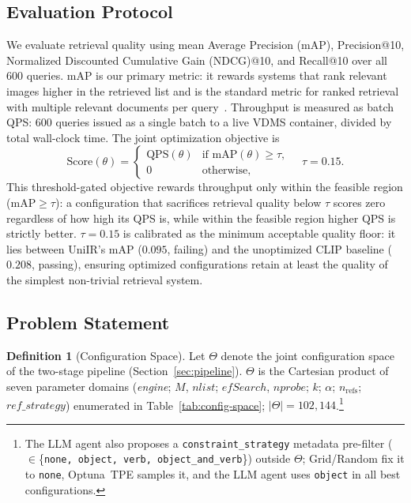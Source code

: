 \documentclass[sigconf, nonacm]{acmart}
\theoremstyle{definition}
\newtheorem{definition}{Definition}
\begin{document}
\subsection{Evaluation Protocol}
We evaluate retrieval quality using mean Average Precision (mAP),
Precision@10, Normalized Discounted Cumulative Gain (NDCG)@10, and Recall@10 over all 600 queries.
mAP is our primary metric: it rewards systems that rank relevant images
higher in the retrieved list and is the standard metric for ranked retrieval
with multiple relevant documents per query~\cite{manning2008ir}.
Throughput is measured as batch QPS: 600 queries issued as a single batch to a
live VDMS container, divided by total wall-clock time.
The joint optimization objective is
\begin{equation}
  \mathrm{Score}(\theta) =
  \begin{cases}
    \mathrm{QPS}(\theta) & \text{if } \mathrm{mAP}(\theta) \geq \tau, \\
    0                    & \text{otherwise,}
  \end{cases}
  \quad \tau = 0.15 .
  \label{eq:score}
\end{equation}
This threshold-gated objective rewards throughput only within the feasible region
($\mathrm{mAP} \geq \tau$): a configuration that sacrifices retrieval quality below
$\tau$ scores zero regardless of how high its QPS is, while within the feasible
region higher QPS is strictly better.
$\tau{=}0.15$ is calibrated as the minimum acceptable quality floor: it lies between
UniIR's mAP ($0.095$, failing) and the unoptimized CLIP baseline ($0.208$, passing),
ensuring optimized configurations retain at least the quality of the simplest
non-trivial retrieval system.

\subsection{Problem Statement}
\label{sec:probstmt}

\begin{definition}[Configuration Space]\label{def:space}
Let $\Theta$ denote the joint configuration space of the two-stage pipeline
(Section~\ref{sec:pipeline}).
$\Theta$ is the Cartesian product of seven parameter domains
(\emph{engine}; $M$, $\mathit{nlist}$; $\mathit{efSearch}$, $\mathit{nprobe}$;
$k$; $\alpha$; $n_{\mathrm{refs}}$; $\mathit{ref\_strategy}$)
enumerated in Table~\ref{tab:config-space}; $|\Theta| = 102{,}144$.\footnote{The LLM agent also proposes a \texttt{constraint\_strategy}
  metadata pre-filter ($\in$\{\texttt{none, object, verb, object\_and\_verb}\}) outside $\Theta$;
  Grid/Random fix it to \texttt{none}, Optuna~TPE samples it, and the LLM agent
  uses \texttt{object} in all best configurations.}
\end{definition}
\end{document}
